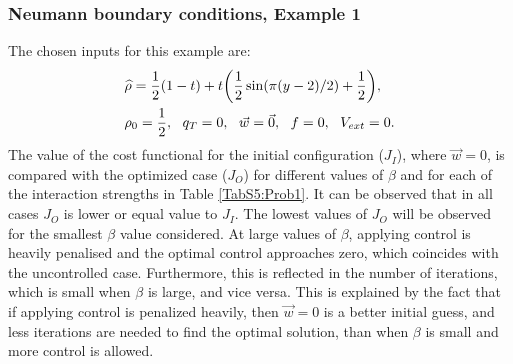 \subsubsection{Neumann boundary conditions, Example 1}	 
The chosen inputs for this example are:
\begin{align*}
&\widehat \rho = \frac{1}{2}(1-t) + t\bigg(\frac{1}{2}\sin(\pi (y - 2)/2) + \frac{1}{2}\bigg),\\
&\rho_{0} = \frac{1}{2}, \ \
\adj_{T} = 0, \ \
\vec{w} = \vec{0}, \ \ 
f =0,\ \
V_{ext} =0.
\end{align*}	
The value of the cost functional for the initial configuration ($J_{I}$), where $\vec{w} =0$, is compared with the optimized case ($J_{O}$) for different values of $\beta$ and for each of the interaction strengths in Table \ref{TabS5:Prob1}. It can be observed that in all cases $J_{O}$ is lower or equal value to $J_{I}$. The lowest values of $J_{O}$ will be observed for the smallest $\beta$ value considered. At large values of $\beta$, applying control is heavily penalised and the optimal control approaches zero, which coincides with the uncontrolled case. Furthermore, this is reflected in the number of iterations, which is small when $\beta$ is large, and vice versa. This is explained by the fact that if applying control is penalized heavily, then $\vec{w} = 0$ is a better initial guess, and less iterations are needed to find the optimal solution, than when $\beta$ is small and more control is allowed.

